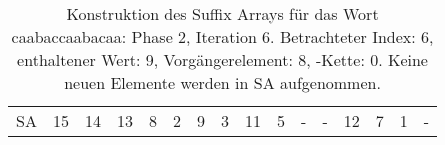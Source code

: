 \begin{table}[H]
\begin{adjustbox}{max width=\textwidth}
\begin{tabular}{lccccccccccccccc}
\multicolumn{1}{l|}{SA}      & \multicolumn{1}{c|}{15} & 14 & \multicolumn{1}{c|}{13} & \multicolumn{1}{c|}{8}     & \multicolumn{1}{c|}{2}      & \multicolumn{1}{c|}{\cellcolor[HTML]{\green}9} & \multicolumn{1}{c|}{3}     & \multicolumn{1}{c|}{11} & \multicolumn{1}{c|}{5}   & -  & \multicolumn{1}{c|}{-}  & 12  & 7   & 1   & -  
\end{tabular}
\end{adjustbox}

\caption[Konstruktion des Suffix Arrays für das Wort caabaccaabacaa: Phase 2, Iteration 6]{Konstruktion des Suffix Arrays für das Wort caabaccaabacaa: Phase 2, Iteration 6. Betrachteter Index: 6, enthaltener Wert: 9, Vorgängerelement: 8, \prevpointer-Kette: 0. Keine neuen Elemente werden in SA aufgenommen.}
\label{table_complex_example_2_6} 
\end{table}

